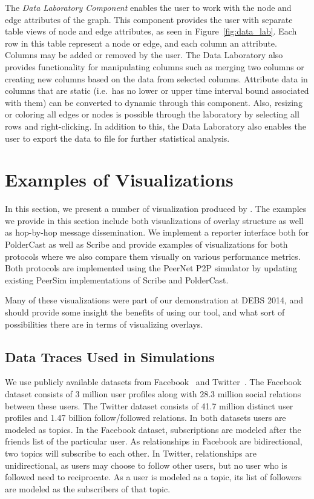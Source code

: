 \begin{description}
    The \emph{Data Laboratory Component} enables the user to work with
    the node and edge attributes of the graph. This component provides
    the user with separate table views of node and edge attributes, as
    seen in Figure~\ref{fig:data_lab}. Each row in this table represent
    a node or edge, and each column an attribute. Columns may be added
    or removed by the user. The Data Laboratory also provides
    functionality for manipulating columns such as merging two columns
    or creating new columns based on the data from selected columns.
    Attribute data in columns that are static (i.e.\ has no lower or
    upper time interval bound associated with them) can be converted to
    dynamic through this component. Also, resizing or coloring all edges
    or nodes is possible through the laboratory by selecting all rows
    and right-clicking. In addition to this, the Data Laboratory also
    enables the user to export the data to file for further statistical
    analysis.

\end{description}

\section{Examples of Visualizations}
\label{sec:examples}

In this section, we present a number of visualization produced by \demo.
The examples we provide in this section include both visualizations of
overlay structure as well as hop-by-hop message dissemination.  We
implement a reporter interface both for PolderCast as well as Scribe and
provide examples of visualizations for both protocols where we also compare them
visually on various performance metrics. Both protocols are implemented
using the PeerNet P2P simulator by updating existing PeerSim
implementations of Scribe and PolderCast.

Many of these visualizations were part of our demonstration at
DEBS 2014, and should provide some insight the benefits of using
our tool, and what sort of possibilities there are in terms of
visualizing overlays.

\subsection{Data Traces Used in Simulations}

We use publicly available datasets from
Facebook~\cite{facebook-eurosys09} and Twitter~\cite{Kwak10www}. The
Facebook dataset consists of 3 million user profiles along with 28.3
million social relations between these users. The Twitter dataset
consists of 41.7 million distinct user profiles and 1.47 billion
follow/followed relations. In both datasets users are modeled as topics.
In the Facebook dataset, subscriptions are modeled after the friends
list of the particular user. As relationships in Facebook are
bidirectional, two topics will subscribe to each other. In Twitter,
relationships are unidirectional, as users may choose to follow other
users, but no user who is followed need to reciprocate. As a user is
modeled as a topic, its list of followers are modeled as the subscribers
of that topic.

